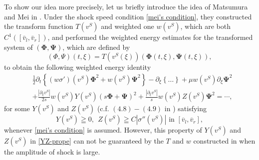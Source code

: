\documentclass[12pt,reqno]{amsart}
\numberwithin{equation}{section}
\def\p{\partial}
\def\ph{\mathbf{\Phi}}
\def\avl{\overline{v}_l}
\def\avr{\overline{v}_r}
\begin{document}
To show our idea more precisely, let us briefly introduce the idea of  Matsumura and Mei in \cite{Gaijin}. Under the shock speed condition \eqref{mei's condition}, they constructed the transform function $T(v^S)$ and weighted one $w(v^S)$, which are both $C^1([\bar{v}_l,\bar{v}_r])$, and performed the weighted energy estimates for the transformed system of  $(\ph,\mathbf{\Psi})$, which are defined by $$(\Phi,\Psi)(t,\xi)=T(v^S(\xi))(\ph(t,\xi),\mathbf{\Psi}(t,\xi)),$$ 
to obtain the following weighted energy identity
\begin{equation}\label{mei1}
	\begin{aligned}
		&\frac{1}{2}\p_t\left\{(w\sigma')(v^S)\ph^2+w(v^S)\mathbf{\Psi}^2\right\}-\p_{\xi}\left\{\dots\right\}+\mu w(v^S)\p_{\xi}\mathbf{\Psi}^2\\
		&+\frac{|\p_{\xi}v^S|}{2s}w(v^S)Y(v^S)(s\ph+\mathbf{\Psi})^2+\frac{|\p_{\xi}v^S|}{s}w(v^S)Z(v^S)\mathbf{\Psi}^2=\cdots,
	\end{aligned}
\end{equation}
for some $Y(v^S)$ and $Z(v^S)$ (c.f. $(4.8)-(4.9)$ in \cite{Gaijin}) satisfying
 \begin{equation}\label{YZ-prope}
 	Y(v^S)\geqq0,~~Z(v^S)\geqq C|\sigma''(v^S)|\text{ in }[\avl,\avr],
 \end{equation}
  whenever \eqref{mei's condition} is assumed. However, this property of $Y(v^S)$ and $Z(v^S)$ in \eqref{YZ-prope} can not be guaranteed by the $T$ and $w$ constructed in \cite{Gaijin} when the amplitude of shock is large. 
  
\end{document}

